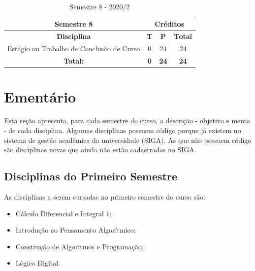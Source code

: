 
\begin{table}[H]
\caption{Semestre 8  - 2020/2}
\centering
\footnotesize
\begin{tabular}{|c|c|c|c|} %
\hline
\hline
\multicolumn{1}{|c|}{\textbf{Semestre 8}}  &  \multicolumn{3}{|c|}{\textbf{Créditos}} \\
\hline
\hline
\textbf{Disciplina} &  \textbf{T}  &  \textbf{P}  & \textbf{Total} \\ 
\hline 

Estágio ou Trabalho de Conclusão de Curso & 0 & 24 & 24 \\

\hline

\hline

\textbf{Total:}  &  \textbf{0}  &  \textbf{24}   & \textbf{24} \\ 

\hline
\hline
\end{tabular}
\label{tab:migracao2}
\end{table}










\doublespacing


\section{Ementário}

Esta seção apresenta, para cada semestre do curso, a descrição - objetivo e menta - de cada disciplina. Algumas disciplinas possuem código porque já existem no sistema de gestão acadêmica da universidade (SIGA). As que não possuem código são disciplinas novas que ainda não estão cadastradas no SIGA.


\subsection{Disciplinas do Primeiro Semestre}

    As disciplinas a serem cursadas no primeiro semestre do curso são:
    
    \begin{itemize}
        \item Cálculo Diferencial e Integral 1;
        \item Introdução ao Pensamento Algorítmico;
        \item Construção de Algoritmos e Programação;
        \item Lógica Digital.
    \end{itemize}

